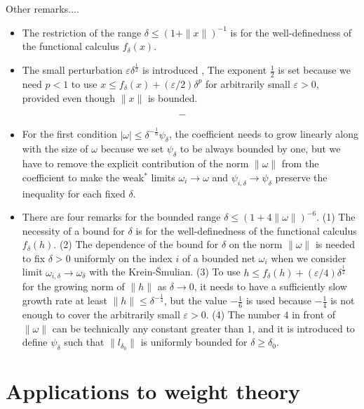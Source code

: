 \documentclass[noamsfonts,a4paper,10pt]{amsart}
\theoremstyle{plain}
\theoremstyle{definition}
\theoremstyle{remark}
\begin{document}
Other remarks....

\begin{itemize}
\item The restriction of the range $\delta\le(1+\|x\|)^{-1}$ is for the well-definedness of the functional calculus $f_\delta(x)$.
\item The small perturbation $\varepsilon\delta^{\frac12}$ is introduced , The exponent $\frac12$ is set because we need $p<1$ to use $x\le f_\delta(x)+(\varepsilon/2)\delta^p$ for arbitrarily small $\varepsilon>0$, provided even though $\|x\|$ is bounded.
\end{itemize}
\[-\]

\begin{itemize}
\item For the first condition $|\omega|\le\delta^{-\frac16}\psi_\delta$, the coefficient needs to grow linearly along with the size of $\omega$ because we set $\psi_\delta$ to be always bounded by one, but we have to remove the explicit contribution of the norm $\|\omega\|$ from the coefficient to make the weak$^*$ limits $\omega_i\to\omega$ and $\psi_{i,\delta}\to\psi_\delta$ preserve the inequality for each fixed $\delta$.
\item There are four remarks for the bounded range $\delta\le(1+4\|\omega\|)^{-6}$.
(1) The necessity of a bound for $\delta$ is for the well-definedness of the functional calculus $f_\delta(h)$.
(2) The dependence of the bound for $\delta$ on the norm $\|\omega\|$ is needed to fix $\delta>0$ uniformly on the index $i$ of a bounded net $\omega_i$ when we consider limit $\omega_{i,\delta}\to\omega_\delta$ with the Krein-\v Smulian.
(3) To use $h\le f_\delta(h)+(\varepsilon/4)\delta^{\frac12}$ for the growing norm of $\|h\|$ as $\delta\to0$, it needs to have a sufficiently slow growth rate at least $\|h\|\le\delta^{-\frac14}$, but the value $-\frac16$ is used because $-\frac14$ is not enough to cover the arbitrarily small $\varepsilon>0$.
(4) The number $4$ in front of $\|\omega\|$ can be technically any constant greater than $1$, and it is introduced to define $\psi_\delta$ such that $\|l_{\delta_0}\|$ is uniformly bounded for $\delta\ge\delta_0$.
\end{itemize}




\section{Applications to weight theory}
\end{document}
